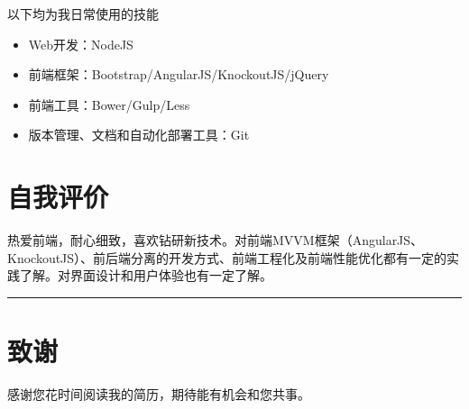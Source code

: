 以下均为我日常使用的技能

\begin{itemize}
\item
  Web开发：NodeJS
\item
  前端框架：Bootstrap/AngularJS/KnockoutJS/jQuery
\item
  前端工具：Bower/Gulp/Less
\item
  版本管理、文档和自动化部署工具：Git
\end{itemize}

\section{自我评价}\label{ux81eaux6211ux8bc4ux4ef7}

热爱前端，耐心细致，喜欢钻研新技术。对前端MVVM框架（AngularJS、KnockoutJS）、前后端分离的开发方式、前端工程化及前端性能优化都有一定的实践了解。对界面设计和用户体验也有一定了解。

\begin{center}\rule{0.5\linewidth}{\linethickness}\end{center}

\section{致谢}\label{ux81f4ux8c22}

感谢您花时间阅读我的简历，期待能有机会和您共事。
